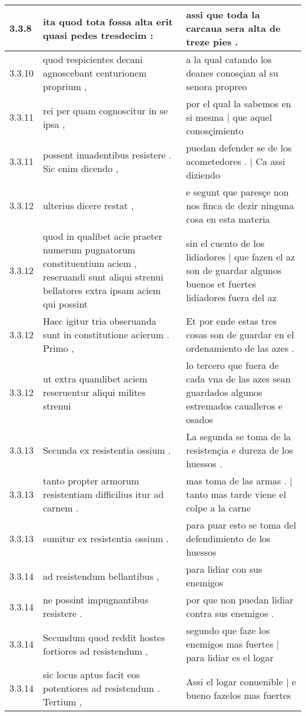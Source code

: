 \begin{tabular}{|p{1cm}|p{6.5cm}|p{6.5cm}|}
3.3.8 & ita quod tota fossa alta erit quasi pedes tresdecim : & assi que toda la carcaua sera alta de treze pies . \\\hline
3.3.10 & quod respicientes decani agnoscebant centurionem proprium , & a la qual catando los deanes conosçian al su senora propreo \\\hline
3.3.11 & rei per quam cognoscitur in se ipsa , & por el qual la sabemos en si mesma | que aquel conosçimiento \\\hline
3.3.11 & possent inuadentibus resistere . Sic enim dicendo , & puedan defender se de los acometedores . | Ca assi diziendo \\\hline
3.3.12 & ulterius dicere restat , & e segunt que paresçe non nos finca de dezir ninguna cosa en esta materia \\\hline
3.3.12 & quod in qualibet acie praeter numerum pugnatorum constituentium aciem , reseruandi sunt aliqui strenui bellatores extra ipsam aciem qui possint & sin el cuento de los lidiadores | que fazen el az son de guardar algunos buenos et fuertes lidiadores fuera del az \\\hline
3.3.12 & Haec igitur tria obseruanda sunt in constitutione acierum . Primo , & Et por ende estas tres cosas son de guardar en el ordenamiento de las azes . \\\hline
3.3.12 & ut extra quamlibet aciem reseruentur aliqui milites strenui & lo tercero que fuera de cada vna de las azes sean guardados algunos estremados caualleros e osados \\\hline
3.3.13 & Secunda ex resistentia ossium . & La segunda se toma de la resistençia e dureza de los huessos . \\\hline
3.3.13 & tanto propter armorum resistentiam difficilius itur ad carnem . & mas toma de las armas . | tanto mas tarde viene el colpe a la carne \\\hline
3.3.13 & sumitur ex resistentia ossium . & para puar esto se toma del defendimiento de los huessos \\\hline
3.3.14 & ad resistendum bellantibus , & para lidiar con sus enemigos \\\hline
3.3.14 & ne possint impugnantibus resistere . & por que non puedan lidiar contra sus enemigos . \\\hline
3.3.14 & Secundum quod reddit hostes fortiores ad resistendum , & segundo que faze los enemigos mas fuertes | para lidiar es el logar \\\hline
3.3.14 & sic locus aptus facit eos potentiores ad resistendum . Tertium , & Assi el logar conuenible | e bueno fazelos mas fuertes \\\hline

\end{tabular}
